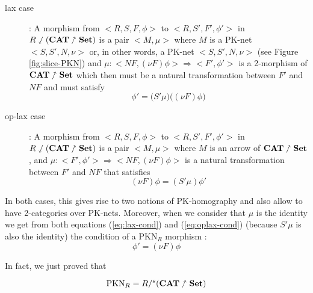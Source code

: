 \begin{description}
    \item[lax case] : A morphism from $\big<R,S,F,\phi\big>$ to  $\big<R,S',F',\phi'\big>$ in $R\sswarrow(\bf CAT\nnearrow Set)$ is a pair $\big<M,\mu\big>$ where
          $M$ is a PK-net $\big<S,S',N,\nu\big>$  or, in other words, a PK-net $\big<S,S',N,\nu\big>$ (see Figure \ref{fig:slice-PKN}) and
          $\mu : \big<NF,(\nu F)\phi\big> \Rightarrow \big<F',\phi'\big>$ is a 2-morphism of  $\textbf{CAT}\nnearrow\bf Set$ which then must be a natural transformation between $F'$ and $NF$ and must satisfy
          \begin{equation}
              \label{eq:lax-cond}
              \phi' = \big(S'\mu\big)\big((\nu F)\phi\big)
          \end{equation}
    \item[op-lax case] : A morphism from $\big<R,S,F,\phi\big>$ to  $\big<R,S',F',\phi'\big>$ in $R\sswarrow(\bf CAT\nnearrow Set)$ is a pair $\big<M,\mu\big>$ where
          $M$ is an arrow  of $\textbf{CAT}\nnearrow\bf Set$, and
          $\mu : \big<F',\phi'\big>\Rightarrow \big<NF,(\nu F)\phi\big>$ is a natural transformation between $F'$ and $NF$ that satisfies
          \begin{equation}
              \label{eq:oplax-cond}
              (\nu F)\phi = (S'\mu)\phi'
          \end{equation}
\end{description}

In both cases, this gives rise to two notions of PK-homography and also allow to have 2-categories over PK-nets. Moreover, when we consider that $\mu$ is the identity we get from both equations (\ref{eq:lax-cond}) and (\ref{eq:oplax-cond}) (because $S'\mu$ is also the identity) the condition of a $\text{PKN}_R$ morphism :
$$\phi' = (\nu F)\phi$$

In fact, we just proved that
\begin{thm}
    $$\text{PKN}_R = R /^s (\bf CAT\nnearrow Set)$$
\end{thm}


